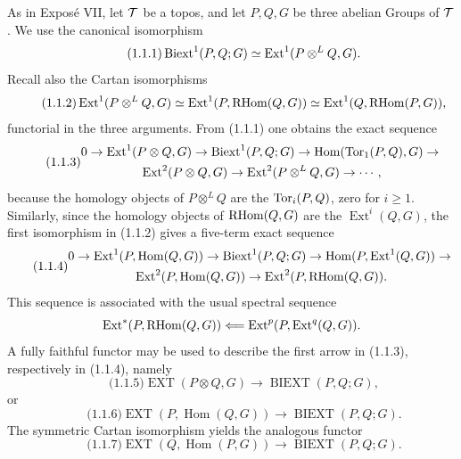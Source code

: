 \documentclass[11pt]{article}
\providecommand{\Hom}{\operatorname{Hom}}
\providecommand{\Ext}{\operatorname{Ext}}
\begin{document}
As in Exposé VII, let \(\mathcal T\) be a topos, and let \(P,Q,G\) be three abelian Groups of \(\mathcal T\).  We use the canonical isomorphism
\begin{equation}\qquad\text{(1.1.1)}
        \Biext^1(P,Q;G)\simeq \Ext^1(P\otimes^L Q,G).
\end{equation}
Recall also the Cartan isomorphisms
\begin{equation}\qquad\text{(1.1.2)}
 \Ext^1(P\otimes^L Q,G)
 \simeq \Ext^1(P,\RHom(Q,G))
 \simeq \Ext^1(Q,\RHom(P,G)),
\end{equation}
functorial in the three arguments.  From (1.1.1) one obtains the exact sequence
\begin{equation}\qquad\text{(1.1.3)}
\begin{gathered}
0\to \Ext^1(P\otimes Q,G)\to \Biext^1(P,Q;G)
\to \Hom(\Torop_1(P,Q),G)\to{}\\
\Ext^2(P\otimes Q,G)\to \Ext^2(P\otimes^L Q,G)\to\cdots,
\end{gathered}
\end{equation}
because the homology objects of \(P\otimes^L Q\) are the \(\operatorname{Tor}_i(P,Q)\), zero for \(i\ge1\).  Similarly, since the homology objects of \(\operatorname{RHom}(Q,G)\) are the \(\Ext^i(Q,G)\), the first isomorphism in (1.1.2) gives a five-term exact sequence
\begin{equation}\qquad\text{(1.1.4)}
\begin{gathered}
0\to \Ext^1(P,\Hom(Q,G))\to \Biext^1(P,Q;G)
\to \Hom(P,\Ext^1(Q,G))\to{}\\
\Ext^2(P,\Hom(Q,G))\to \Ext^2(P,\RHom(Q,G)).
\end{gathered}
\end{equation}
This sequence is associated with the usual spectral sequence
\[
        \Ext^*(P,\RHom(Q,G))\Longleftarrow
        \Ext^p(P,\Ext^q(Q,G)).
\]
A fully faithful functor may be used to describe the first arrow in (1.1.3), respectively in (1.1.4), namely
\begin{equation}\qquad\text{(1.1.5)}
        \operatorname{EXT}(P\otimes Q,G)\to\operatorname{BIEXT}(P,Q;G),
\end{equation}
or
\begin{equation}\qquad\text{(1.1.6)}
        \operatorname{EXT}(P,\Hom(Q,G))\to\operatorname{BIEXT}(P,Q;G).
\end{equation}
The symmetric Cartan isomorphism yields the analogous functor
\begin{equation}\qquad\text{(1.1.7)}
        \operatorname{EXT}(Q,\Hom(P,G))\to\operatorname{BIEXT}(P,Q;G).
\end{equation}
\end{document}
